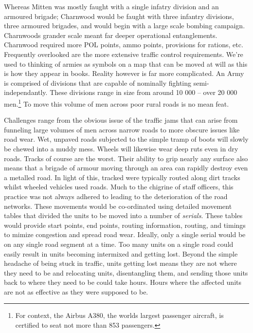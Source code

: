 \documentclass[noraggedright]{turabian-researchpaper}
\begin{document}
Whereas Mitten was mostly faught with a single infatry division and an armoured
brigade; Charnwood would be faught with three infantry divisions, three 
armoured brigades, and would begin with a large scale bombing campaign.
Charnwoods grander scale meant far deeper operational entanglements.  
Charnwood required more POL points, ammo points, provisions for rations, etc.
Frequently overlooked are the more extensive traffic control 
requirements.  We're used to thinking of armies as symbols on a map that can
be moved at will as this is how they appear in books.  Reality however is 
far more complicated.  An Army is comprised of divisions that are capable of 
nominally fighting semi-independantly.  These divisions range in size from
around 10 000 -- over 20 000 men.\footnote{For context, the Airbus A380, the
worlds largest passenger aircraft, is certified to seat not more than 853
passengers.%
}  To move this volume of men across poor rural roads 
is no mean feat.

Challenges range from the obvious issue of the traffic jams that can arise from
funneling large volumes of men across narrow roads to more obscure issues like 
road wear.  Wet, unpaved roads subjected to the simple tramp of boots will
slowly be chewed into a muddy mess.  Wheels will likewise wear deep ruts even 
in dry roads.  Tracks of course are the worst.  Their ability to grip nearly
any surface also means that a brigade of armour moving through an area can
rapidly destroy even a metalled road.  In light of this, tracked were 
typically routed along dirt tracks whilst wheeled vehicles used roads.  Much
to the chigrine of staff officers, this practice was not always adhered to
leading to the deterioration of the road networks.\autocite[27 Armd Bde Adm 
Order No 8 (See July Appendix)][Para 3]{27wd}
These movements would be co-ordinated using detailed movement tables that 
divided the units to be moved into a number of \textit{serials}. 
These tables would provide start points, end points, routing 
information, routing, and timings to mimize congestion and spread road wear.
Ideally, only a single serial would be on any single road segment at a time.
Too many units on a single road could easily result in units becoming 
intermixed and getting lost.  Beyond the simple headache of being stuck in 
traffic, units getting lost means they are not where they need to be and
relocating units, disentangling them, and sending those units back to where
they need to be could take hours.  Hours where the affected units are not
as effective as they were supposed to be.  
\end{document}
